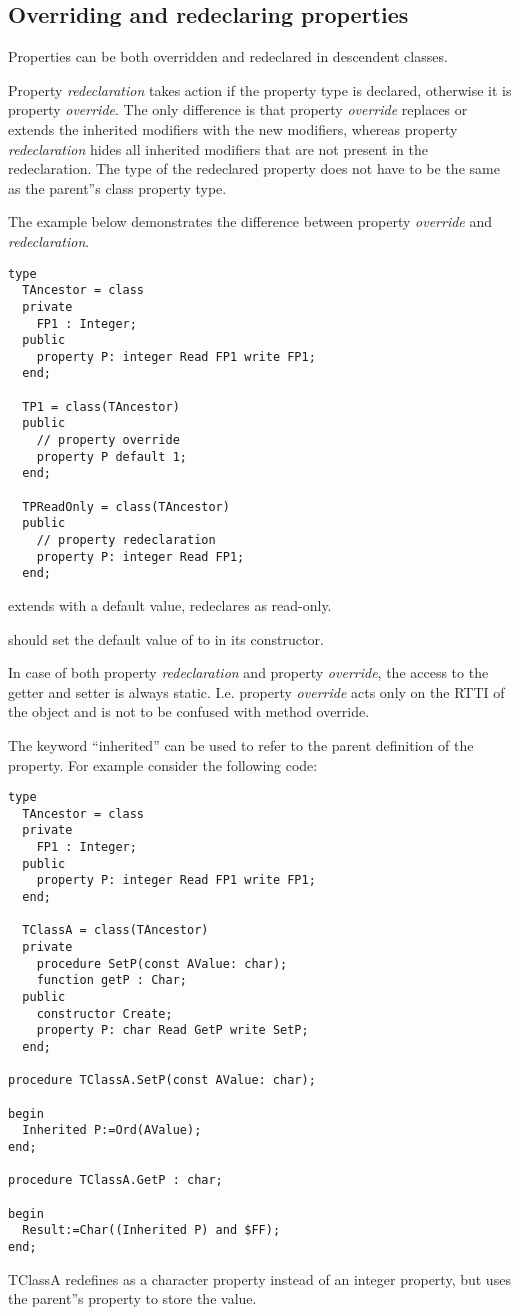 \subsection{Overriding and redeclaring properties}
Properties can be both overridden and redeclared in descendent classes.

Property {\em redeclaration} takes action if the property type is declared, otherwise it is property {\em override}.
The only difference is that property {\em override} replaces or extends the inherited modifiers with the new modifiers,
whereas property {\em redeclaration} hides all inherited modifiers that are not present in the redeclaration.
The type of the redeclared property does not have to be the same as the parent''s class property type.

The example below demonstrates the difference between property {\em override} and {\em redeclaration}.
\begin{verbatim}
type
  TAncestor = class
  private
    FP1 : Integer;
  public
    property P: integer Read FP1 write FP1;
  end;

  TP1 = class(TAncestor)
  public
    // property override
    property P default 1;
  end;

  TPReadOnly = class(TAncestor)
  public
    // property redeclaration
    property P: integer Read FP1;
  end;
\end{verbatim}

 extends  with a default value,  redeclares  as read-only.

\begin{remark}
 should set the default value of  to  in its constructor.
\end{remark}

In case of both property {\em redeclaration} and property {\em override}, the access
to the getter and setter is always static.
I.e. property {\em override} acts only on the RTTI of the object and is not to be confused with method override.

The keyword ``inherited''  can be used to refer to the parent
definition of the property. For example consider the following code:
\begin{verbatim}
type
  TAncestor = class
  private
    FP1 : Integer;
  public
    property P: integer Read FP1 write FP1;
  end;

  TClassA = class(TAncestor)
  private
    procedure SetP(const AValue: char);
    function getP : Char;
  public
    constructor Create;
    property P: char Read GetP write SetP;
  end;

procedure TClassA.SetP(const AValue: char);

begin
  Inherited P:=Ord(AValue);
end;

procedure TClassA.GetP : char;

begin
  Result:=Char((Inherited P) and $FF);
end;
\end{verbatim}
TClassA redefines  as a character property instead of an integer
property, but uses the parent''s  property to store the value.

